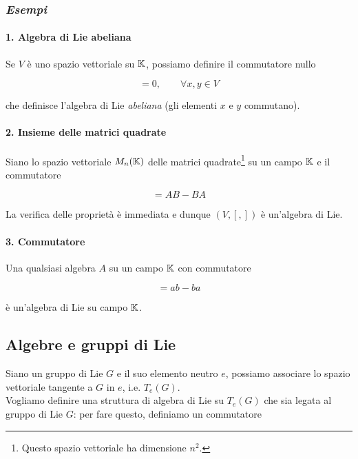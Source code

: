 \subsubsection{\textit{Esempi}}

\paragraph{1. Algebra di Lie abeliana}

Se $ V $ è uno spazio vettoriale su $ \mathbb{K} $, possiamo definire il commutatore nullo

\begin{equation}
	[x,y] = 0, \qquad \forall x,y \in V
\end{equation}

che definisce l'algebra di Lie \textit{abeliana} (gli elementi $ x $ e $ y $ commutano).

\paragraph{2. Insieme delle matrici quadrate}

Siano lo spazio vettoriale $ M_{n}(\mathbb{K}) $ delle matrici quadrate\footnote{%
	Questo spazio vettoriale ha dimensione $ n^{2} $.%
} su un campo $ \mathbb{K} $ e il commutatore

\begin{equation}
	[A,B] = AB - BA
\end{equation}

La verifica delle proprietà è immediata e dunque $ (V,[,]) $ è un'algebra di Lie.

\paragraph{3. Commutatore}

Una qualsiasi algebra $ A $ su un campo $ \mathbb{K} $ con commutatore

\begin{equation}
	[a,b] = ab - ba
\end{equation}

è un'algebra di Lie su campo $ \mathbb{K} $.

\subsection{Algebre e gruppi di Lie}

Siano un gruppo di Lie $ G $ e il suo elemento neutro $ e $, possiamo associare lo spazio vettoriale tangente a $ G $ in $ e $, i.e. $ T_{e}(G) $.\\
Vogliamo definire una struttura di algebra di Lie su $ T_{e}(G) $ che sia legata al gruppo di Lie $ G $: per fare questo, definiamo un commutatore

